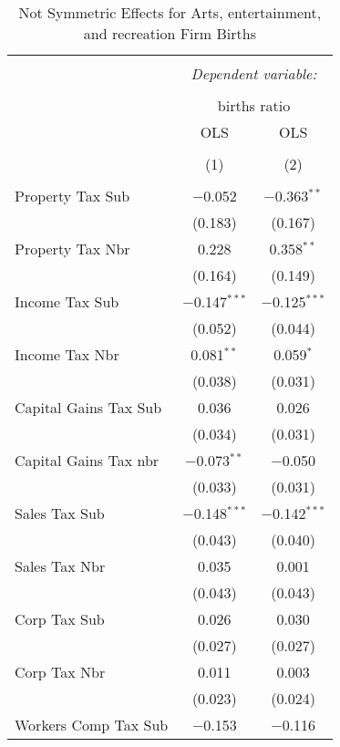 
\begin{table}[!htbp] \centering 
  \caption{Not Symmetric Effects for  Arts, entertainment, and recreation Firm Births} 
  \label{} 
\begin{tabular}{@{\extracolsep{5pt}}lcc} 
\\[-1.8ex]\hline 
\hline \\[-1.8ex] 
 & \multicolumn{2}{c}{\textit{Dependent variable:}} \\ 
\cline{2-3} 
\\[-1.8ex] & \multicolumn{2}{c}{births ratio} \\ 
 & OLS & OLS \\ 
\\[-1.8ex] & (1) & (2)\\ 
\hline \\[-1.8ex] 
 Property Tax Sub & $-$0.052 & $-$0.363$^{**}$ \\ 
  & (0.183) & (0.167) \\ 
  Property Tax Nbr & 0.228 & 0.358$^{**}$ \\ 
  & (0.164) & (0.149) \\ 
  Income Tax Sub & $-$0.147$^{***}$ & $-$0.125$^{***}$ \\ 
  & (0.052) & (0.044) \\ 
  Income Tax Nbr & 0.081$^{**}$ & 0.059$^{*}$ \\ 
  & (0.038) & (0.031) \\ 
  Capital Gains Tax Sub & 0.036 & 0.026 \\ 
  & (0.034) & (0.031) \\ 
  Capital Gains Tax nbr & $-$0.073$^{**}$ & $-$0.050 \\ 
  & (0.033) & (0.031) \\ 
  Sales Tax Sub & $-$0.148$^{***}$ & $-$0.142$^{***}$ \\ 
  & (0.043) & (0.040) \\ 
  Sales Tax Nbr & 0.035 & 0.001 \\ 
  & (0.043) & (0.043) \\ 
  Corp Tax Sub & 0.026 & 0.030 \\ 
  & (0.027) & (0.027) \\ 
  Corp Tax Nbr & 0.011 & 0.003 \\ 
  & (0.023) & (0.024) \\ 
  Workers Comp Tax Sub & $-$0.153 & $-$0.116 \\ 

\end{tabular}
\end{table}
